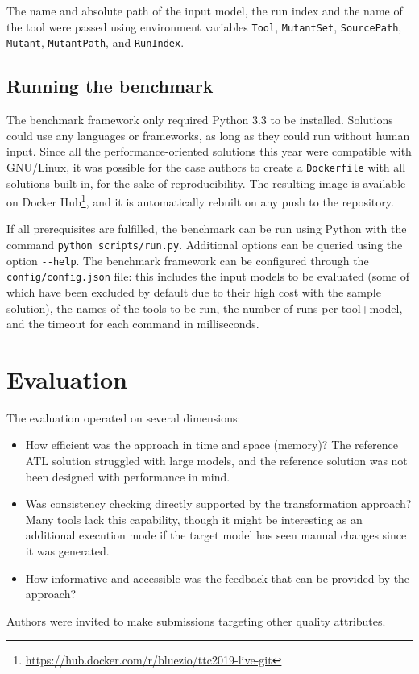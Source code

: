 \documentclass[a4paper]{article}
\newcommand*{\file}[1]{\texttt{#1}}
\begin{document}
The name and absolute path of the input model, the run index and the name of the
tool were passed using environment variables \file{Tool}, \file{MutantSet},
\file{SourcePath}, \file{Mutant}, \file{MutantPath}, and \file{RunIndex}.

\subsection{Running the benchmark}
\label{sec:running-benchmark}

The benchmark framework only required Python 3.3 to be installed. Solutions
could use any languages or frameworks, as long as they could run without human
input. Since all the performance-oriented solutions this year were compatible
with GNU/Linux, it was possible for the case authors to create a
\file{Dockerfile} with all solutions built in, for the sake of reproducibility.
The resulting image is available on Docker
Hub\footnote{\url{https://hub.docker.com/r/bluezio/ttc2019-live-git}}, and it is
automatically rebuilt on any push to the repository.

If all prerequisites are fulfilled, the benchmark can be run using Python with
the command \file{python scripts/run.py}. Additional options can be queried
using the option \file{{-}{-}help}. The benchmark framework can be configured
through the \file{config/config.json} file: this includes the input models to be
evaluated (some of which have been excluded by default due to their high cost
with the sample solution), the names of the tools to be run, the number of runs
per tool+model, and the timeout for each command in milliseconds.

\section{Evaluation}
\label{sec:evaluation}

The evaluation operated on several dimensions:

\begin{itemize}
\item How efficient was the approach in time and space (memory)? The reference
  ATL solution struggled with large models, and the reference solution was not
  been designed with performance in mind.

\item Was consistency checking directly supported by the transformation
  approach? Many tools lack this capability, though it might be interesting as
  an additional execution mode if the target model has seen manual changes since
  it was generated.

\item How informative and accessible was the feedback that can be provided by
  the approach?
\end{itemize}

Authors were invited to make submissions targeting other quality attributes.



\end{document}
